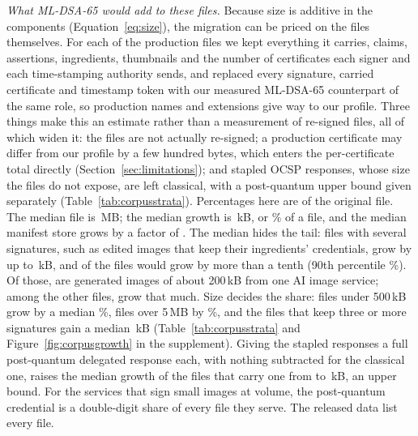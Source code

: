 \emph{What ML-DSA-65 would add to these files.} Because size is additive in
the components (Equation~\ref{eq:size}), the migration can be priced on the
files themselves. For each of the \NcpqFiles{} production files we kept
everything it carries, claims, assertions, ingredients, thumbnails and the
number of certificates each signer and each time-stamping authority sends, and
replaced every signature, carried certificate and timestamp token with our
measured ML-DSA-65 counterpart of the same role, so production names and
extensions give way to our profile. Three things make this an estimate rather
than a measurement of re-signed files, all of which widen it: the files are not
actually re-signed; a production certificate may differ from our profile by a
few hundred bytes, which enters the per-certificate total directly
(Section~\ref{sec:limitations}); and stapled OCSP responses, whose size the
files do not expose, are left classical, with a post-quantum upper bound given
separately (Table~\ref{tab:corpusstrata}). Percentages here are of the original
file. The median file is \NcpqFileMedMB\,MB; the median growth is
\NcpqAddMedkB\,kB, or \NcpqPctMed\% of a file, and the median
manifest store grows by a factor of \NcpqStoreGrowth. The median hides the
tail: files with several signatures, such as edited images that keep their
ingredients' credentials, grow by up to \NcpqAddMaxkB\,kB, and
\NcpqOverTen{} of the \NcpqFiles{} files would grow by more than a tenth
(90th percentile \NcpqPctPNinety\%). Of those, \NcpqOverTenTop{} are generated
images of about 200\,kB from one AI image service; among the other
\NcpqFilesOther{} files, \NcpqOverTenOther{} grow that much. Size decides the share: files under
500\,kB grow by a median \NcpqSmallMedPct\%, files over 5\,MB by
\NcpqBigMedPct\%, and the \NcpqThreeSigFiles{} files that keep three or more
signatures gain a median \NcpqThreeSigMedkB\,kB (Table~\ref{tab:corpusstrata}
and Figure~\ref{fig:corpusgrowth} in the supplement). Giving the
\NcpqOcspSigs{} stapled responses a full post-quantum delegated response
each, with nothing subtracted for the classical one, raises the median growth
of the \NcpqOcspFiles{} files that carry one from \NcpqOcspFilesMedkB{} to
\NcpqOcspFilesBoundMedkB\,kB, an upper bound. For the services that sign small
images at volume, the post-quantum credential is a double-digit share of every
file they serve. The released data list every file.
